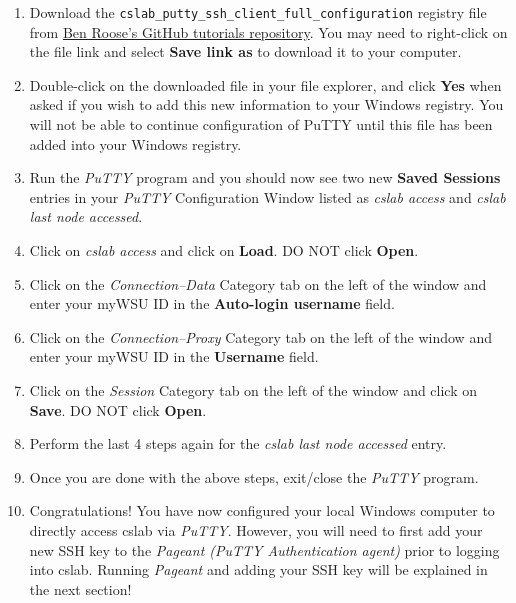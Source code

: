 \documentclass[12pt]{article}
\begin{document}
\begin{flushleft}
\begin{enumerate}
  \item Download the \verb|cslab_putty_ssh_client_full_configuration| registry file from \href{https://github.com/benroose/tutorials/tree/master/cslab_tutorials/cslab_ssh_client_config_files}{Ben Roose's GitHub tutorials repository}. You may need to right-click on the file link and select \textbf{Save link as} to download it to your computer.
  \item Double-click on the downloaded file in your file explorer, and click \textbf{Yes} when asked if you wish to add this new information to your Windows registry. You will not be able to continue configuration of PuTTY until this file has been added into your Windows registry.
  \item Run the \textit{PuTTY} program and you should now see two new \textbf{Saved Sessions} entries in your \textit{PuTTY} Configuration Window listed as \textit{cslab access} and \textit{cslab last node accessed}.
  \item Click on \textit{cslab access} and click on \textbf{Load}. DO NOT click \textbf{Open}.
  \item Click on the \textit{Connection--Data} Category tab on the left of the window and enter your myWSU ID in the \textbf{Auto-login username} field.
  \item Click on the \textit{Connection--Proxy} Category tab on the left of the window and enter your myWSU ID in the \textbf{Username} field.
  \item Click on the \textit{Session} Category tab on the left of the window and click on \textbf{Save}. DO NOT click \textbf{Open}.
  \item Perform the last 4 steps again for the \textit{cslab last node accessed} entry.
  \item Once you are done with the above steps, exit/close the \textit{PuTTY} program.
  \item Congratulations! You have now configured your local Windows computer to directly access cslab via \textit{PuTTY}. However, you will need to first add your new SSH key to the \textit{Pageant (PuTTY Authentication agent)} prior to logging into cslab. Running \textit{Pageant} and adding your SSH key will be explained in the next section!
\end{enumerate}


\end{flushleft}
\end{document}
